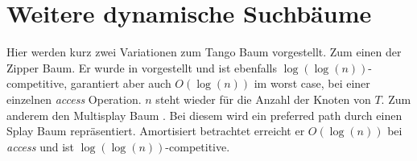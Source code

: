 \documentclass[a4paper,12pt]{article}
\begin{document}
\section {Weitere dynamische Suchbäume}
Hier werden kurz zwei Variationen zum Tango Baum vorgestellt. Zum einen der Zipper Baum. Er wurde in \cite{zipper} vorgestellt und ist ebenfalls $\log\left(\log\left(n\right)\right)$-competitive,  garantiert aber auch  $O\left(\log \left(n\right)\right)$ im worst case, bei einer einzelnen \textit{access} Operation. $n$ steht wieder für die Anzahl der Knoten von $T$. Zum anderem den Multisplay Baum \cite{multisplay}. Bei diesem wird ein preferred path durch einen Splay Baum repräsentiert. Amortisiert betrachtet erreicht er $O\left(\log \left(n\right)\right)$ bei \textit{access} und ist  $\log\left(\log\left(n\right)\right)$-competitive. 
\end{document}
